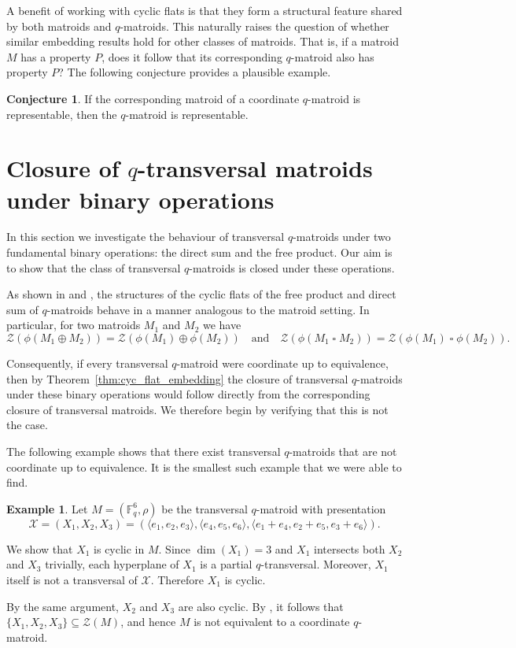 \documentclass{article}
\theoremstyle{definition}
\newtheorem{example}[theorem]{{{Example}}}
\newtheorem{conjecture}[theorem]{{{Conjecture}}}
\newcommand{\sq}{\mathbin{\square}}
\begin{document}
A benefit of working with cyclic flats is that they form a structural feature shared by both matroids and $q$-matroids. This naturally raises the question of whether similar embedding results hold for other classes of matroids. That is, if a matroid $M$ has a property $P$, does it follow that its corresponding $q$-matroid also has property $P$? The following conjecture provides a plausible example.

\begin{conjecture}
    If the corresponding matroid of a coordinate $q$-matroid is representable, then the $q$-matroid is representable.
\end{conjecture}

\section{Closure of \texorpdfstring{$q$}{q}-transversal matroids under binary operations}

In this section we investigate the behaviour of transversal $q$-matroids under two fundamental binary operations: the direct sum and the free product. Our aim is to show that the class of transversal $q$-matroids is closed under these operations.

As shown in \cite{AlfaranoByrneFulcher2025} and \cite{GluesingLuerssenJany2024}, the structures of the cyclic flats of the free product and direct sum of $q$-matroids behave in a manner analogous to the matroid setting. In particular, for two matroids $M_1$ and $M_2$ we have
\[
\mathcal{Z}(\phi(M_1\oplus M_2))=\mathcal{Z}(\phi(M_1)\oplus\phi(M_2))
\quad\text{and}\quad
\mathcal{Z}(\phi(M_1\sq M_2))=\mathcal{Z}(\phi(M_1)\sq\phi(M_2)).
\]

Consequently, if every transversal $q$-matroid were coordinate up to equivalence, then by Theorem~\ref{thm:cyc_flat_embedding} the closure of transversal $q$-matroids under these binary operations would follow directly from the corresponding closure of transversal matroids. We therefore begin by verifying that this is not the case.

The following example shows that there exist transversal $q$-matroids that are not coordinate up to equivalence. It is the smallest such example that we were able to find.

\begin{example}
Let $M=(\mathbb{F}_q^6,\rho)$ be the transversal $q$-matroid with presentation
\[
\mathcal{X}=(X_1,X_2,X_3)
=
(\langle e_1,e_2,e_3\rangle,\langle e_4,e_5,e_6\rangle,\langle e_1+e_4,e_2+e_5,e_3+e_6\rangle).
\]

We show that $X_1$ is cyclic in $M$. Since $\dim(X_1)=3$ and $X_1$ intersects both $X_2$ and $X_3$ trivially, each hyperplane of $X_1$ is a partial $q$-transversal. Moreover, $X_1$ itself is not a transversal of $\mathcal{X}$. Therefore $X_1$ is cyclic.

By the same argument, $X_2$ and $X_3$ are also cyclic. By \cite[Theorem 21]{saaltink2025theoryqtransversals}, it follows that $\{X_1,X_2,X_3\}\subseteq\mathcal{Z}(M)$, and hence $M$ is not equivalent to a coordinate $q$-matroid.
\end{example}
\end{document}
